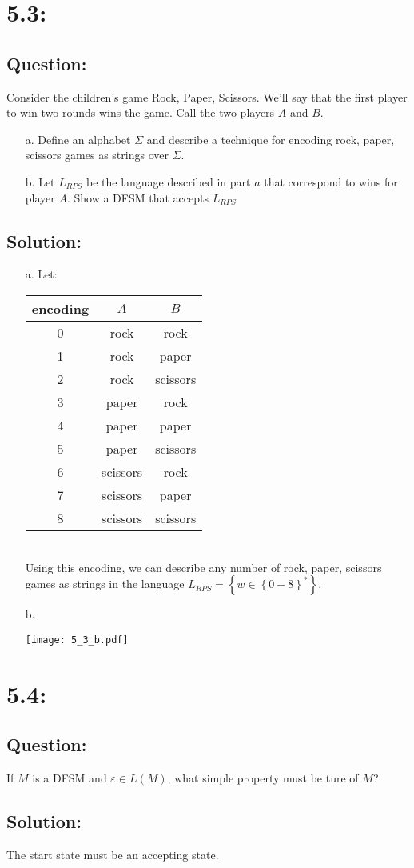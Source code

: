 \documentclass[11pt, oneside]{article}
\newcommand{\question}[3]{ 
  \section{#1:} 
  \subsection*{Question:} #2
  \subsection*{Solution:} #3 
}
\begin{document}
\question{5.3}
{
  Consider the children's game Rock, Paper, Scissors.  We'll say that the first
  player to win two rounds wins the game.  Call the two players $A$ and $B$.
  \begin{enumerate}
    \item[a.]
      Define an alphabet $\Sigma$ and describe a technique for encoding rock,
      paper, scissors games as strings over $\Sigma$.
    \item[b.]
      Let $L_{RPS}$ be the language described in part $a$ that correspond to wins
      for player $A$.  Show a DFSM that accepts $L_{RPS}$
  \end{enumerate}
}
{
  \begin{enumerate}
    \item[a.]
      Let:\\
      \begin{tabular}{c | c | c}
        encoding & $A$ & $B$\\
        \hline
        0 & rock     & rock     \\
        1 & rock     & paper    \\
        2 & rock     & scissors \\
        3 & paper    & rock     \\
        4 & paper    & paper    \\
        5 & paper    & scissors \\
        6 & scissors & rock     \\
        7 & scissors & paper    \\
        8 & scissors & scissors \\
      \end{tabular}
      \\Using this encoding, we can describe any number of rock, paper, scissors games 
      as strings in the language 
      $L_{RPS} = \left\{ w \in \left\{ 0-8 \right\}^*    \right\}$.
    \item[b.]
      \begin{minipage}{\linewidth}
        \centering
        \texttt{[image: 5\_3\_b.pdf]}
      \end{minipage}
  \end{enumerate}
}

\question{5.4}
{
  If $M$ is a DFSM and $\varepsilon \in L(M)$, what simple property must be ture
  of $M$?
}
{
  The start state must be an accepting state.
}
\end{document}
